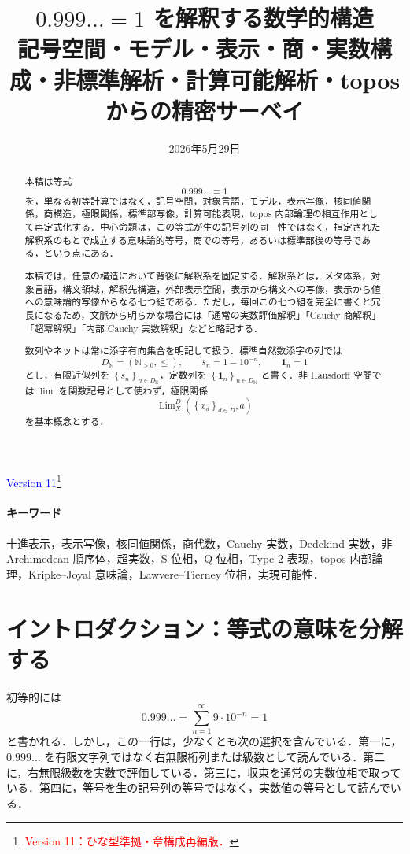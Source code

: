 \documentclass[a4paper,11pt]{ltjsarticle}
\title{\Large \(0.999\ldots=1\) を解釈する数学的構造\\
\normalsize 記号空間・モデル・表示・商・実数構成・非標準解析・計算可能解析・topos からの精密サーベイ}
\author{}
\date{2026年5月29日}
\theoremstyle{jpdef}
\theoremstyle{jpthm}
\newcommand{\N}{\mathbb{N}}
\newcommand{\Lim}{\operatorname{Lim}}
\newcommand{\Ns}{\N_{>0}}
\newcommand{\DN}{D_{\N}}
\newcommand{\seq}[2]{\left\{#1\right\}_{#2}}
\begin{document}
\maketitle
\begin{center}
\textcolor{blue}{\small Version 11\footnote{\textcolor{red}{Version 11：ひな型準拠・章構成再編版．}}}
\end{center}

\begin{abstract}
本稿は等式
\[
 0.999\ldots=1
\]
を，単なる初等計算ではなく，記号空間，対象言語，モデル，表示写像，核同値関係，商構造，極限関係，標準部写像，計算可能表現，topos 内部論理の相互作用として再定式化する．中心命題は，この等式が生の記号列の同一性ではなく，指定された解釈系のもとで成立する意味論的等号，商での等号，あるいは標準部後の等号である，という点にある．

本稿では，任意の構造において背後に解釈系を固定する．解釈系とは，メタ体系，対象言語，構文領域，解釈先構造，外部表示空間，表示から構文への写像，表示から値への意味論的写像からなる七つ組である．ただし，毎回この七つ組を完全に書くと冗長になるため，文脈から明らかな場合には「通常の実数評価解釈」「Cauchy 商解釈」「超冪解釈」「内部 Cauchy 実数解釈」などと略記する．

数列やネットは常に添字有向集合を明記して扱う．標準自然数添字の列では
\[
  \DN=(\Ns,\le),\qquad s_n=1-10^{-n},\qquad \mathbf1_n=1
\]
とし，有限近似列を \(\seq{s_n}{n\in\DN}\)，定数列を \(\seq{\mathbf1_n}{n\in\DN}\) と書く．非 Hausdorff 空間では \(\lim\) を関数記号として使わず，極限関係
\[
  \Lim_X^D(\seq{x_d}{d\in D},a)
\]
を基本概念とする．
\end{abstract}

\paragraph{キーワード}
十進表示，表示写像，核同値関係，商代数，Cauchy 実数，Dedekind 実数，非 Archimedean 順序体，超実数，S-位相，Q-位相，Type-2 表現，topos 内部論理，Kripke--Joyal 意味論，Lawvere--Tierney 位相，実現可能性．

\tableofcontents

\section{イントロダクション：等式の意味を分解する}

初等的には
\[
 0.999\ldots=\sum_{n=1}^{\infty}9\cdot 10^{-n}=1
\]
と書かれる．しかし，この一行は，少なくとも次の選択を含んでいる．第一に，\(0.999\ldots\) を有限文字列ではなく右無限桁列または級数として読んでいる．第二に，右無限級数を実数で評価している．第三に，収束を通常の実数位相で取っている．第四に，等号を生の記号列の等号ではなく，実数値の等号として読んでいる．
\end{document}
